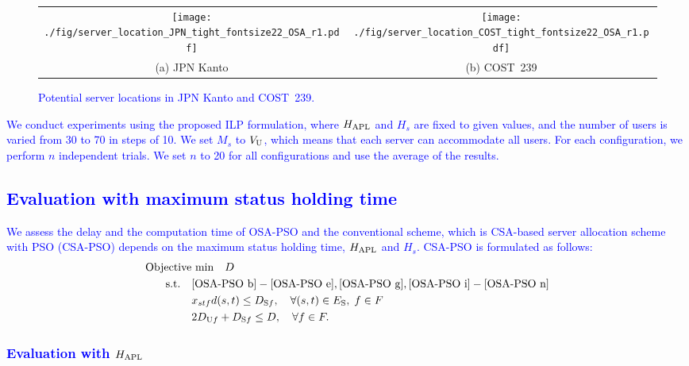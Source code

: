 \documentclass[10pt, letterpaper]{IEEEtran}
\newcommand\blue[1]{\textcolor{blue}{#1}}
\begin{document}
\begin{CJK}{UTF8}{ipxm}
{\begin{figure}[t]
\begin{center}
      \begin{tabular}{cc}
      \texttt{[image: ./fig/server\_location\_JPN\_tight\_fontsize22\_OSA\_r1.pdf]} &
      \texttt{[image: ./fig/server\_location\_COST\_tight\_fontsize22\_OSA\_r1.pdf]} \\
      (a) JPN Kanto & (b) COST~239
      \end{tabular}
  \end{center}
  \caption{\blue{Potential server locations in JPN Kanto and COST~239.}}
  \label{fig:ServerLocation}
\end{figure}
}

\blue{
We conduct experiments using the proposed ILP formulation, where $H_{\rm APL}$ and $H_s$ are fixed to given values, and the number of users is varied from 30 to 70 in steps of 10.
We set $M_s$ to $V_{\rm U}$, which means that each server can accommodate all users.
For each configuration, we perform $n$ independent trials.
We set $n$ to 20 for all configurations
and use the average of the results.
}

\subsection{\blue{Evaluation with maximum status holding time}}
\label{subsec:Evaluation with maximum status holding time}

\blue{
We assess the delay and the computation time of OSA-PSO and the conventional scheme, which is CSA-based server allocation scheme with PSO (CSA-PSO) depends on the maximum status holding time, $H_{\rm APL}$ and $H_s$.
CSA-PSO is formulated as follows:
\begin{subequations} \label{CSA-PSO}
  \begin{align}
  \text{Objective}&\text{ min}\quad D \label{CSA-PSO a} \\
  \rm{s.t.} \quad
  & \eqref{OSA-PSO b}-\eqref{OSA-PSO e}, \eqref{OSA-PSO g}, \eqref{OSA-PSO i}-\eqref{OSA-PSO n} \label{CSA-PSO b} \\
  &x_{stf}d(s,t) \le D_{\mathrm{S}f}, \quad \forall (s,t) \in E_{\rm{S}}, \; f \in F \label{CSA-PSO c} \\
  &2D_{\mathrm{U}f} + D_{\mathrm{S}f} \leq D, \quad \forall f \in F. \label{CSA-PSO d}
  \end{align}
\end{subequations}
}

\subsubsection{\blue{Evaluation with $H_{\rm APL}$}}


\end{CJK}
\end{document}
